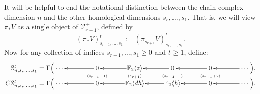 \documentclass[11pt]{amsart}
\theoremstyle{plain}
\theoremstyle{definition}
\newcommand{\calV}{\mathcal{V}}
\theoremstyle{plain}
\newcommand{\vect}[2]{\calV^{#1}_{#2}}
\newcommand{\F}{\mathbb{F}}
\newcommand{\complexes}{\textup{ch}_+}
\begin{document}
\begin{Conventions and notation}
It will be helpful to end the notational distinction between the chain complex dimension $n$ and the other homological dimensions $s_r,\ldots,s_1$. That is, we will view $\pi_*V$ as a single object of $\vect{+}{r+1}$, defined by
\[(\pi_*V)^t_{s_{r+1},\ldots,s_1}:=(\pi_{s_{r+1}}V)^t_{s_{r},\ldots,s_1}.\]
Now for any collection of indices $s_{r+1},\ldots,s_1\geq0$ and $t\geq1$, define:
\begin{gather*}
\phantom{C\mathbb{S}_{n,s_r,\ldots,s_1}^t=\Gamma\Bigl(}\xymatrix@R=0mm@1@!C{
{\makebox[0cm][r]{$\,\mathbb{S}_{n,s_r,\ldots,s_1}^t=\Gamma\Bigl($}\cdots\,} &%
{\,0\,}\ar[l]
&%
\F_2\langle z\rangle\ar[l]
&%
{\,0\,}\ar[l]
&{\,0\,}\ar[l]
&{\,\cdots\Bigr),} \ar[l]
\\
&\raisebox{.4mm}{\tiny$\smash{(s_{r+1}\!-\!1)}$}
&\raisebox{.4mm}{\tiny$\smash{(s_{r+1}  )}$}
&\raisebox{.4mm}{\tiny$\smash{(s_{r+1}\!+\!1)}$}
&\raisebox{.4mm}{\tiny$\smash{(s_{r+1}\!+\!2)}$}\\
{\makebox[0cm][r]{$\,C\mathbb{S}_{n,s_r,\ldots,s_1}^t=\Gamma\Bigl($}\cdots\,} &%
{\,0\,}\ar[l]
&%
\F_2\langle dh\rangle\ar[l]
&%
\F_2\langle h\rangle\ar[l]
&{\,0\,}\ar[l]
&{\,\cdots\Bigr).} \ar[l]
}
\end{gather*}

\end{Conventions and notation}
\end{document}
